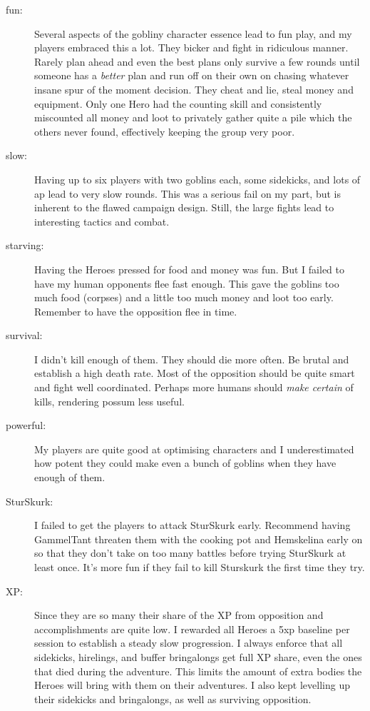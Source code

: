 \begin{description}

    \item[fun:] Several aspects of the gobliny character essence lead to fun play, and my players embraced this a lot. They bicker and fight in ridiculous manner. Rarely plan ahead and even the best plans only survive a few rounds until someone has a \emph{better} plan and run off on their own on chasing whatever insane spur of the moment decision. They cheat and lie, steal money and equipment. Only one Hero had the counting skill and consistently miscounted all money and loot to privately gather quite a pile which the others never found, effectively keeping the group very poor.

    \item[slow:] Having up to six players with two goblins each, some sidekicks, and lots of ap lead to very slow rounds. This was a serious fail on my part, but is inherent to the flawed campaign design. Still, the large fights lead to interesting tactics and combat.

    \item[starving:] Having the Heroes pressed for food and money was fun. But I failed to have my human opponents flee fast enough. This gave the goblins too much food (corpses) and a little too much money and loot too early. Remember to have the opposition flee in time.

    \item[survival:] I didn't kill enough of them. They should die more often. Be brutal and establish a high death rate. Most of the opposition should be quite smart and fight well coordinated. Perhaps more humans should \emph{make certain} of kills, rendering possum less useful.

    \item[powerful:] My players are quite good at optimising characters and I underestimated how potent they could make even a bunch of goblins when they have enough of them.

    \item[SturSkurk:] I failed to get the players to attack SturSkurk early. Recommend having GammelTant threaten them with the cooking pot and Hemskelina early on so that they don't take on too many battles before trying SturSkurk at least once. It's more fun if they fail to kill Sturskurk the first time they try.
    
    \item[XP:] Since they are so many their share of the XP from opposition and accomplishments are quite low. I rewarded all Heroes a 5xp baseline per session to establish a steady slow progression. I always enforce that all sidekicks, hirelings, and buffer bringalongs get full XP share, even the ones that died during the adventure. This limits the amount of extra bodies the Heroes will bring with them on their adventures. I also kept levelling up their sidekicks and bringalongs, as well as surviving opposition.

\end{description}

